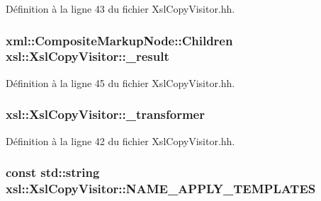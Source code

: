Définition à la ligne 43 du fichier XslCopyVisitor.hh.

\hypertarget{classxsl_1_1_xsl_copy_visitor_af0d37e73a689f6e2fe7bc081ba0ac25f}{
\subsubsection[{\_\-result}]{\setlength{\rightskip}{0pt plus 5cm}xml::CompositeMarkupNode::Children {\bf xsl::XslCopyVisitor::\_\-result}}}
\label{classxsl_1_1_xsl_copy_visitor_af0d37e73a689f6e2fe7bc081ba0ac25f}


Définition à la ligne 45 du fichier XslCopyVisitor.hh.

\hypertarget{classxsl_1_1_xsl_copy_visitor_a62a8afbd16b10ef1c0bdf07e7aabf62e}{
\subsubsection[{\_\-transformer}]{ {\bf xsl::XslCopyVisitor::\_\-transformer}}}
\label{classxsl_1_1_xsl_copy_visitor_a62a8afbd16b10ef1c0bdf07e7aabf62e}


Définition à la ligne 42 du fichier XslCopyVisitor.hh.

\hypertarget{classxsl_1_1_xsl_copy_visitor_aafb7cd7f2bd7d9253d016804c8f2eeb6}{
\subsubsection[{NAME\_\-APPLY\_\-TEMPLATES}]{\setlength{\rightskip}{0pt plus 5cm}const std::string {\bf xsl::XslCopyVisitor::NAME\_\-APPLY\_\-TEMPLATES}}}
\label{classxsl_1_1_xsl_copy_visitor_aafb7cd7f2bd7d9253d016804c8f2eeb6}


